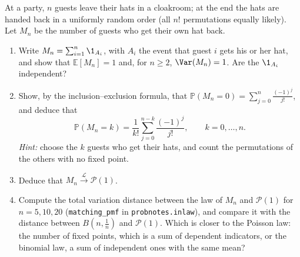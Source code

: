\begin{exercise}\label{ex:cl-matching}
\medium At a party, $n$ guests leave their hats in a cloakroom; at the end the hats are handed
back in a uniformly random order (all $n!$ permutations equally likely). Let $M_n$ be the number
of guests who get their own hat back.
\begin{enumerate}[label=(\alph*)]
  \item Write $M_n=\sum_{i=1}^n\1_{A_i}$, with $A_i$ the event that guest $i$ gets his or her hat,
    and show that $\mathbb E[M_n]=1$ and, for $n\ge2$, $\Var(M_n)=1$. Are the $\1_{A_i}$
    independent?
  \item Show, by the inclusion--exclusion formula, that
    $\mathbb P(M_n=0)=\sum_{j=0}^n\frac{(-1)^j}{j!}$, and deduce that
    \[
      \mathbb P(M_n=k)=\frac1{k!}\sum_{j=0}^{n-k}\frac{(-1)^j}{j!},\qquad k=0,\dots,n .
    \]
    \emph{Hint:} choose the $k$ guests who get their hats, and count the permutations of the
    others with no fixed point.
  \item Deduce that $M_n\xrightarrow{\mathcal L}\mathcal P(1)$.
  \item Compute the total variation distance between the law of $M_n$ and $\mathcal P(1)$ for
    $n=5,10,20$ (\texttt{matching\_pmf} in \texttt{probnotes.inlaw}), and compare it with the
    distance between $B(n,\frac1n)$ and $\mathcal P(1)$. Which is closer to the Poisson law: the
    number of fixed points, which is a sum of dependent indicators, or the binomial law, a sum of
    independent ones with the same mean?
\end{enumerate}
\end{exercise}

